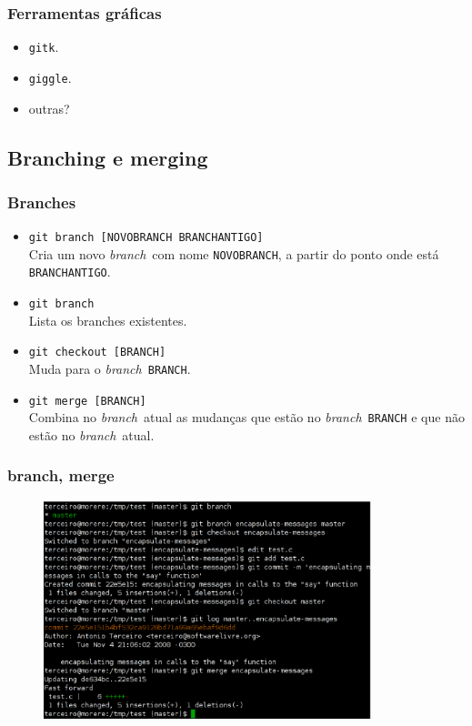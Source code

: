 \documentclass{beamer}
\newcommand{\branch}{\emph{branch}}
\begin{document}
\begin{frame}
  \frametitle{Ferramentas gráficas}
  \begin{itemize}
    \item \texttt{gitk}.
    \item \texttt{giggle}.
    \item outras?
  \end{itemize}
\end{frame}

\subsection{Branching e merging}

\begin{frame}
  \frametitle{Branches}
  \begin{itemize}
    \item \texttt{git branch [NOVOBRANCH BRANCHANTIGO]}\\
      Cria um novo \branch\ com nome \texttt{NOVOBRANCH}, a partir do
      ponto onde está \texttt{BRANCHANTIGO}.
      \pause

    \item \texttt{git branch}\\
      Lista os branches existentes.
      \pause

    \item \texttt{git checkout [BRANCH]}\\
      Muda para o \branch\ \texttt{BRANCH}.
      \pause

    \item \texttt{git merge [BRANCH]}\\
      Combina no \branch\ atual as mudanças que estão no \branch\ 
      \texttt{BRANCH} e que não estão no \branch\ atual.
  \end{itemize}
\end{frame}

\begin{frame}
  \frametitle{branch, merge}
  \begin{figure}[h]
    \begin{center}
      \includegraphics[width=0.85\textwidth]{figs/git-screenshot-branch-merge.eps}
    \end{center}
    \label{fig:git-branch-merge}
  \end{figure}
\end{frame}
\end{document}

